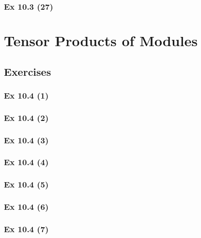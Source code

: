 \subsubsection{Ex 10.3 (27)}\label{sec:Ex_10.3.27}

\newpage		%

\section{Tensor Products of Modules}\label{sec:10.4}	
\subsection*{Exercises}\label{sec:10.4_Exercises}

\subsubsection{Ex 10.4 (1)}\label{sec:Ex_10.4.1}

\subsubsection{Ex 10.4 (2)}\label{sec:Ex_10.4.2}

\subsubsection{Ex 10.4 (3)}\label{sec:Ex_10.4.3}

\subsubsection{Ex 10.4 (4)}\label{sec:Ex_10.4.4}

\subsubsection{Ex 10.4 (5)}\label{sec:Ex_10.4.5}

\subsubsection{Ex 10.4 (6)}\label{sec:Ex_10.4.6}

\subsubsection{Ex 10.4 (7)}\label{sec:Ex_10.4.7}

